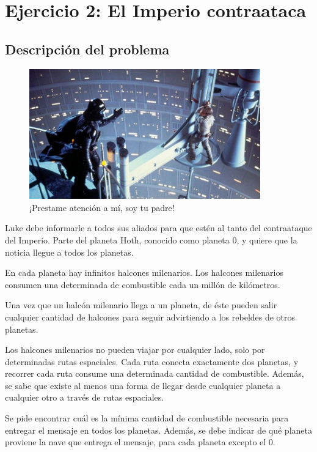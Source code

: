 \section{Ejercicio 2: El Imperio contraataca}

    \subsection{Descripción del problema}

    \begin{figure}[ht]
        \begin{center}
            \includegraphics[width=10cm]{imagenes/el_imperio_contraataca.jpg}
            \caption*{¡Prestame atención a mí, soy tu padre!}
        \end{center}
    \end{figure}

    Luke debe informarle a todos sus aliados para que estén al tanto del contraataque del Imperio. Parte del planeta Hoth, conocido como planeta 0, y quiere que la noticia llegue a todos los planetas.

    En cada planeta hay infinitos halcones milenarios. Los halcones milenarios consumen una determinada de combustible cada un millón de kilómetros.

    Una vez que un halcón milenario llega a un planeta, de éste pueden salir cualquier cantidad de halcones para seguir advirtiendo a los rebeldes de otros planetas.

    Los halcones milenarios no pueden viajar por cualquier lado, solo por determinadas rutas espaciales. Cada ruta conecta exactamente dos planetas, y recorrer cada ruta consume una determinada cantidad de combustible. Además, se sabe que existe al menos una forma de llegar desde cualquier planeta a cualquier otro a través de rutas espaciales.

    Se pide encontrar cuál es la mínima cantidad de combustible necesaria para entregar el mensaje en todos los planetas. Además, se debe indicar de qué planeta proviene la nave que entrega el mensaje, para cada planeta excepto el 0.

